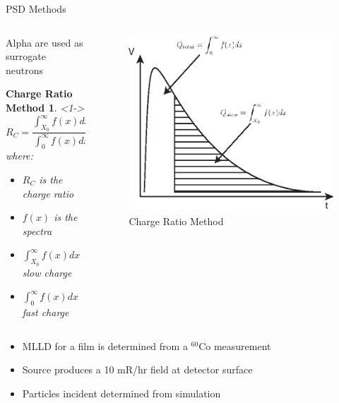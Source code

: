 \begin{frame}{PSD Methods}
\begin{columns}[onlytextwidth]
\begin{column}{0.45\textwidth}
	Alpha are used as surrogate neutrons
	\newtheorem{thm9}{Charge Ratio Method}
	\begin{thm9}<1->
		$$ R_C = \frac{\int_{X_0}^{\infty}{f(x)dx}}{\int_{0}^{\infty}{f(x)dx}} $$
	where:
	\begin{itemize}
		\tiny
		\item $R_C$ is the charge ratio
		\item $f(x)$ is the spectra
		\item $\int_{X_0}^{\infty}{f(x)dx}$ slow charge
		\item $\int_{0}^{\infty}{f(x)dx}$ fast charge
	\end{itemize}
	\end{thm9}
\end{column}
\begin{column}{0.45\textwidth}
	\begin{figure}
		\centering
		\includegraphics[width=\textwidth]{images/PSD_Spectra.eps}
		\caption{Charge Ratio Method}
		\label{fig:PSD_ChargeRatio}
	\end{figure}
\end{column}
\end{columns}

	\begin{itemize}
		\tiny
		\item MLLD for a film is determined from a ${}^{60}$Co measurement
		\item Source produces a 10 mR/hr field at detector surface
		\item Particles incident determined from simulation
	\end{itemize}
\end{frame}
